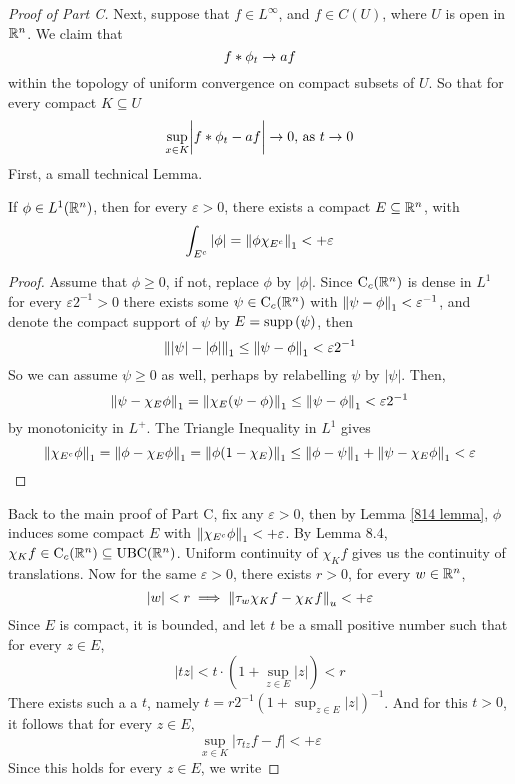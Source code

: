 \documentclass[../../main.tex]{subfiles}
\begin{document}
\begin{proof}[Proof of Part C]
    Next, suppose that $f\in L^\infty$, and $f\in C(U)$, where $U$ is open in $\mathbb{R}^n$. We claim that 
    \[f\ast \phi_t\to af\]
    within the topology of uniform convergence on compact subsets of $U$. So that for every compact $K\subseteq U$\[\sup_{x\in K}\biggl|f\ast\phi_t-af\biggr|\to 0,\,\text{as }t\to 0\]
    First, a small technical Lemma.
    \begin{lemma}\label{814 lemma}
        If $\phi\in L^1({\mathbb{R}^n})$, then for every $\varepsilon>0$, there exists a compact $E\subseteq{\mathbb{R}^n}$, with
        \[\int_{E^c}|\phi|=\norm{\phi\chi_{E^c}}_1<+\varepsilon\]
    \end{lemma}
    \begin{proof}
        Assume that $\phi\geq 0$, if not, replace $\phi$ by $|\phi|$. Since $\operatorname{C}_c({{\mathbb{R}^n}})$ is dense in $L^1$ for every $\varepsilon2^{-1}>0$ there exists some $\psi\in\operatorname{C}_c({{\mathbb{R}^n}})$ with $\norm{\psi-\phi}_1<\varepsilon^{-1}$, and denote the compact support of $\psi$ by $E=\operatorname{supp}{(\psi)}$, then
        \[\norm{|\psi|-|\phi|}_1\leq\norm{\psi-\phi}_1<\varepsilon2^{-1}\]
        So we can assume $\psi\geq 0$ as well, perhaps by relabelling $\psi$ by $|\psi|$. Then,
        \[\norm{\psi-\chi_E\phi}_1=\norm{\chi_E(\psi-\phi)}_1\leq\norm{\psi-\phi}_1<\varepsilon2^{-1}\]
        by monotonicity in $L^+$. The Triangle Inequality in $L^1$ gives
        \[\norm{\chi_{E^c}\phi}_1=\norm{\phi-\chi_E\phi}_1=\norm{\phi(1-\chi_E)}_1\leq \norm{\phi - \psi}_1 + \norm{\psi - \chi_{E}\phi}_1<\varepsilon\]
    \end{proof}
        Back to the main proof of Part C, fix any $\varepsilon>0$, then by Lemma \ref{814 lemma}, $\phi$ induces some compact $E$ with $\norm{\chi_{E^c}\phi}_1<+\varepsilon$. By Lemma 8.4, $\chi_Kf\in \operatorname{C}_c({{\mathbb{R}^n}})\subseteq\operatorname{UBC}(\mathbb{R}^n)$. Uniform continuity of $\chi_Kf$ gives us the continuity of translations. Now for the same $\varepsilon>0$, there exists $r>0$, for every $w\in{\mathbb{R}^n}$,
        \begin{equation}\label{814 condition 1}
            |w|<r\implies\norm{\tau_w\chi_Kf-\chi_Kf}_u<+\varepsilon
        \end{equation}
        Since $E$ is compact, it is bounded, and let $t$ be a small positive number such that for every $z\in E$,
        \[|tz|<t\cdot(1+\sup_{z\in E}|z|)<r\]
        There exists such a a $t$, namely $t = r2^{-1}(1+\sup_{z\in E}|z|)^{-1}$. And for this $t>0$, it follows that for every $z\in E$, \[\sup_{x\in K}\left|\tau_{tz}f-f\right|<+\varepsilon\]
        Since this holds for every $z\in E$, we write

\end{proof}
\end{document}
